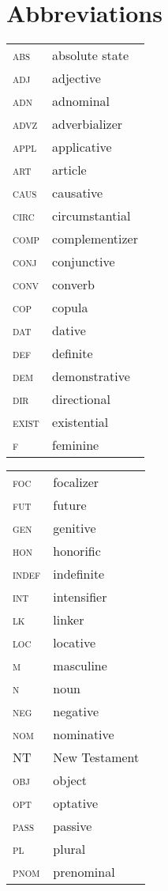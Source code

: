 \documentclass[output=paper,colorlinks,citecolor=brown ,chinesefont]{langscibook}
\begin{document}
\section*{Abbreviations}
\begin{tabularx}{.45\textwidth}{lQ}
\textsc{abs} & absolute state \\
\textsc{adj} & adjective \\
\textsc{adn}& adnominal\\
\textsc{advz}& adverbializer\\
\textsc{appl}& applicative\\
\textsc{art}& article\\
\textsc{caus} & causative\\
\textsc{circ}& circumstantial\\
\textsc{comp}& complementizer\\
\textsc{conj}& conjunctive\\
\textsc{conv}& converb\\
\textsc{cop}& copula\\
\textsc{dat} & dative\\
\textsc{def}& definite\\
\textsc{dem}& demonstrative\\
\textsc{dir} & directional\\
\textsc{exist}& existential\\
\textsc{f}& feminine\\
\end{tabularx}
\begin{tabularx}{.45\textwidth}{lQ}
\textsc{foc}& focalizer\\
\textsc{fut}& future\\
\textsc{gen}& genitive\\
\textsc{hon}& honorific\\
\textsc{indef}& indefinite\\
\textsc{int}& intensifier\\
\textsc{lk}& linker\\
\textsc{loc}& locative\\
\textsc{m}& masculine\\
\textsc{n}& noun\\
\textsc{neg} & negative\\
\textsc{nom}& nominative\\
NT & New Testament \\
\textsc{obj}& object\\
\textsc{opt}& optative\\
\textsc{pass}& passive\\
\textsc{pl}& plural\\
\textsc{pnom}& prenominal\\
\end{tabularx}
\end{document}
